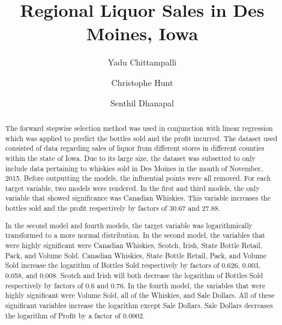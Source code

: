 \documentclass[]{elsarticle} %
\begin{document}
\begin{frontmatter}

  \title{Regional Liquor Sales in Des Moines, Iowa}
    \author[CUNY School of Professional Studies]{Yadu Chittampalli}
    \author[CUNY School of Professional Studies]{Christophe Hunt}
  
    \author[CUNY School of Professional Studies]{Senthil Dhanapal}
  
      \address[CUNY School of Professional Studies]{CUNY School of Professional Studies, Data Analytics, New York, NY}
  
  \begin{abstract}
  The forward stepwise selection method was used in conjunction with
  linear regression which was applied to predict the bottles sold and the
  profit incurred. The dataset used consisted of data regarding sales of
  liquor from different stores in different counties within the state of
  Iowa. Due to its large size, the dataset was subsetted to only include
  data pertaining to whiskies sold in Des Moines in the month of November,
  2015. Before outputting the models, the influential points were all
  removed. For each target variable, two models were rendered. In the
  first and third models, the only variable that showed significance was
  Canadian Whiskies. This variable increases the bottles sold and the
  profit respectively by factors of 30.67 and 27.88.
  
  In the second model and fourth models, the target variable was
  logarithmically transformed to a more normal distribution. In the second
  model, the variables that were highly significant were Canadian
  Whiskies, Scotch, Irish, State Bottle Retail, Pack, and Volume Sold.
  Canadian Whiskies, State Bottle Retail, Pack, and Volume Sold increase
  the logarithm of Bottles Sold respectively by factors of 0.626, 0.003,
  0.058, and 0.008. Scotch and Irish will both decrease the logarithm of
  Bottles Sold respectively by factors of 0.6 and 0.76. In the fourth
  model, the variables that were highly significant were Volume Sold, all
  of the Whiskies, and Sale Dollars. All of these significant variables
  increase the logarithm except Sale Dollars. Sale Dollars decreases the
  logarithm of Profit by a factor of 0.0002.
  \end{abstract}
  
 \end{frontmatter}
\end{document}
